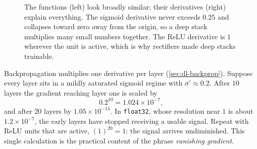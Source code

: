 \begin{figure}[htbp]
\centering
{}
\hfill
{}
\caption{The functions (left) look broadly similar; their derivatives (right)
explain everything. The sigmoid derivative never exceeds $0.25$ and collapses
toward zero away from the origin, so a deep stack multiplies many small numbers
together. The ReLU derivative is $1$ wherever the unit is active, which is why
rectifiers made deep stacks trainable.}
\label{fig:dl-activation-curves}
\end{figure}

\begin{workedexample}
Backpropagation multiplies one derivative per layer (\cref{sec:dl-backprop}).
Suppose every layer sits in a mildly saturated sigmoid regime with
$\sigma' \approx 0.2$. After $10$ layers the gradient reaching layer one is
scaled by
\[
  0.2^{10} = 1.024\times10^{-7},
\]
and after $20$ layers by $1.05\times10^{-14}$. In \texttt{float32}, whose
resolution near $1$ is about $1.2\times10^{-7}$, the early layers have stopped
receiving a usable signal. Repeat with ReLU units that are active,
$\left(1\right)^{20} = 1$: the signal arrives undiminished. This single
calculation is the practical content of the phrase \emph{vanishing gradient}.
\end{workedexample}

